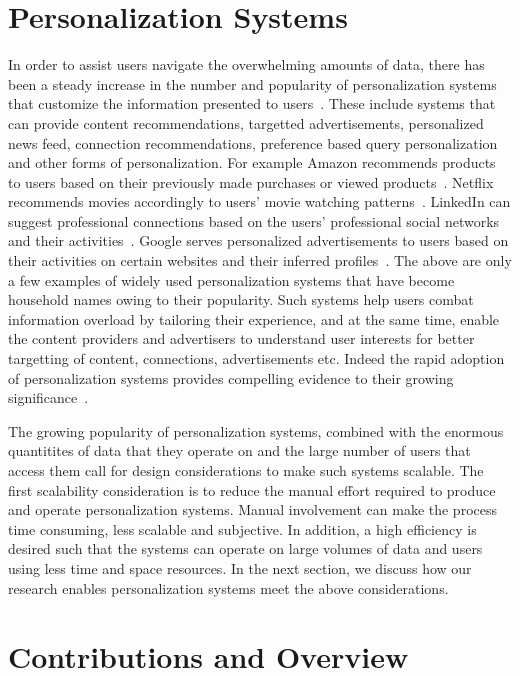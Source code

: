 \documentclass[12pt]{ucsddissertation}
\begin{document}
\section{Personalization Systems}
In order to assist users navigate the overwhelming amounts of data, there has been a steady increase in the number and popularity of personalization systems that customize the information presented to users~\cite{eirinaki2003web}. These include systems that can provide content recommendations, targetted advertisements, personalized news feed, connection recommendations, preference based query personalization and other forms of personalization. For example Amazon recommends products to users based on their previously made purchases or viewed products~\cite{Amazon}. Netflix recommends movies accordingly to users' movie watching patterns~\cite{Netflix}. LinkedIn can suggest professional connections based on the users' professional social networks and their activities~\cite{LinkedIn}. Google serves personalized advertisements to users based on their activities on certain websites and their inferred profiles~\cite{Google,castelluccia2012betrayed,GoogleAdsense}. The above are only a few examples of widely used personalization systems that have become household names owing to their popularity. Such systems help users combat information overload by tailoring their experience, and at the same time, enable the content providers and advertisers to understand user interests for better targetting of content, connections, advertisements etc. Indeed the rapid adoption of personalization systems provides compelling evidence to their growing significance~\cite{castellano2009innovations}. 


The growing popularity of personalization systems, combined with the enormous quantitites of data that they operate on and the large number of users that access them call for design considerations to make such systems scalable. The first scalability consideration is to reduce the manual effort required to produce and operate personalization systems. Manual involvement can make the process time consuming, less scalable and subjective. In addition, a high efficiency is desired such that the systems can operate on large volumes of data and users using less time and space resources. In the next section, we discuss how our research enables personalization systems meet the above considerations. 

\section{Contributions and Overview}
\end{document}

